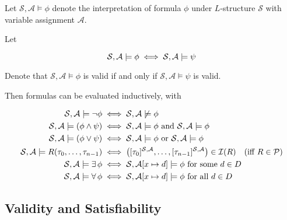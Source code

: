 \begin{remark}
    Let $\mathcal{S}, \mathcal{A} \models \phi$ denote the interpretation of 
    formula $\phi$ under $L$-structure $\mathcal{S}$ with variable assignment 
    $\mathcal{A}$.
    
    Let
    
    \begin{equation*}
        \mathcal{S}, \mathcal{A} \models \phi
            \;\Longleftrightarrow\; \mathcal{S}, \mathcal{A} \models \psi
    \end{equation*}
    
    Denote that $\mathcal{S}, \mathcal{A} \models \phi$ is valid if and only if
    $\mathcal{S}, \mathcal{A} \models \psi$ is valid.
\end{remark}

\begin{definition}
    Then formulas can be evaluated inductively, with
    
    \begin{align}
        \mathcal{S}, \mathcal{A} \models \neg \phi 
            &\;\Longleftrightarrow\; \mathcal{S}, \mathcal{A} \not\models \phi \\
        \mathcal{S}, \mathcal{A} \models (\phi \land \psi)
            &\;\Longleftrightarrow\; \mathcal{S}, \mathcal{A} \models \phi
                \text{ and } \mathcal{S}, \mathcal{A} \models \phi \\
        \mathcal{S}, \mathcal{A} \models (\phi \lor \psi)
            &\;\Longleftrightarrow\; \mathcal{S}, \mathcal{A} \models \phi
                \text{ or } \mathcal{S}, \mathcal{A} \models \phi \\
        \mathcal{S}, \mathcal{A} \models R(\tau_0, \dots, \tau_{n-1})
            &\;\Longleftrightarrow\; \left(
                [\tau_0]^{\mathcal{S}, \mathcal{A}},
                \ldots, 
                [\tau_{n-1}]^{\mathcal{S}, \mathcal{A}} 
            \right) \in \mathcal{I}(R) \quad\text{(iff $R \in \mathcal{P}$)} \\
        \mathcal{S}, \mathcal{A} \models \operatorname{\exists} \phi
            &\;\Longleftrightarrow\; \mathcal{S}, \mathcal{A}[x \mapsto d] \models \phi 
            \text{ for some } d \in D \\
        \mathcal{S}, \mathcal{A} \models \operatorname{\forall} \phi
            &\;\Longleftrightarrow\; \mathcal{S}, \mathcal{A}[x \mapsto d] \models \phi
            \text{ for all } d \in D
    \end{align}
\end{definition}

\subsection{Validity and Satisfiability}

